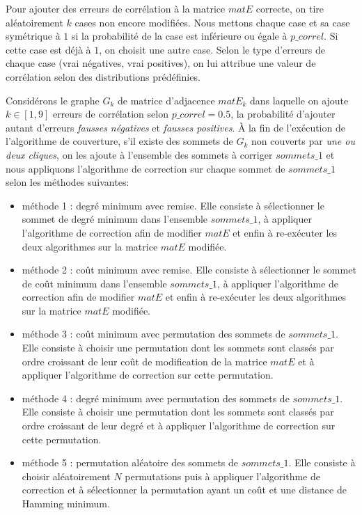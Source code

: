 \documentclass[onecolumn, 12pt]{book}
\begin{document}
Pour ajouter des erreurs de corr\'elation \`a la matrice $matE$ correcte, on tire al\'eatoirement $k$ cases non encore modifi\'ees. Nous mettons chaque case et sa case sym\'etrique \`a $1$ si la probabilit\'e de la case est inf\'erieure ou \'egale \`a $p\_correl$. Si cette case est d\'ej\`a \`a $1$, on choisit une autre case. Selon le type d'erreurs de chaque case (vrai n\'egatives, vrai positives), on lui attribue une valeur de corr\'elation selon des distributions pr\'ed\'efinies.
\newline

Consid\'erons le graphe $G_k$ de matrice d'adjacence $matE_k$ dans laquelle on ajoute $k \in [1,9]$ erreurs de corr\'elation selon $p\_correl=0.5$, la probabilit\'e d'ajouter autant d'erreurs {\em fausses n\'egatives } et {\em fausses positives}. 
\`A la fin de l'ex\'ecution de l'algorithme de couverture, s'il existe des sommets de $G_k$ non couverts par {\em une ou deux cliques}, on les ajoute \`a l'ensemble des sommets \`a corriger $sommets\_1$ et nous appliquons l'algorithme  de correction sur chaque sommet de $sommets\_1$ selon les m\'ethodes suivantes:
\begin{itemize}
\item m\'ethode 1 : degr\'e minimum avec remise.\newline
Elle consiste \`a s\'electionner le sommet de degr\'e minimum dans l'ensemble $sommets\_1$, \`a appliquer l'algorithme de correction afin de modifier $matE$ et enfin \`a re-ex\'ecuter les deux algorithmes sur la matrice $matE$ modifi\'ee.
\item m\'ethode 2 : co\^ut minimum avec remise. \newline
Elle consiste \`a s\'electionner le sommet de co\^ut minimum dans l'ensemble $sommets\_1$, \`a appliquer l'algorithme de correction afin de modifier $matE$ et enfin \`a re-ex\'ecuter les deux algorithmes sur la matrice $matE$ modifi\'ee.
\item m\'ethode 3 : co\^ut minimum avec permutation des sommets de $sommets\_1$. \newline
Elle consiste \`a choisir une permutation dont les sommets sont class\'es par ordre croissant de leur co\^ut  de modification de la matrice $matE$ et \`a appliquer l'algorithme de correction sur cette permutation.
\item m\'ethode 4 :  degr\'e minimum avec  permutation des sommets de $sommets\_1$. \newline
Elle consiste \`a choisir une permutation dont les sommets sont class\'es par ordre croissant de leur degr\'e et \`a appliquer l'algorithme de correction sur cette permutation.
\item m\'ethode 5 : permutation al\'eatoire des sommets de $sommets\_1$. \newline
Elle consiste \`a choisir al\'eatoirement $N$ permutations puis \`a appliquer l'algorithme de correction et \`a s\'electionner la permutation ayant un co\^ut et une distance de Hamming minimum.
\end{itemize}
\end{document}
